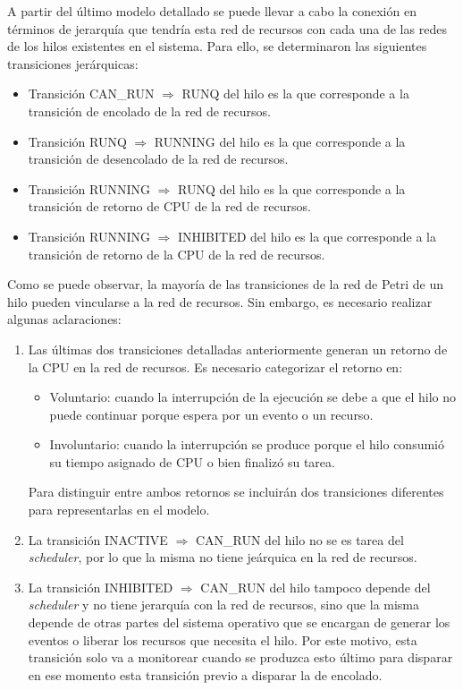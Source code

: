 \documentclass[a4paper]{book}
\begin{document}
A partir del \'ultimo modelo detallado se puede llevar a cabo la conexi\'on en t\'erminos de jerarqu\'ia que tendr\'ia esta red de recursos con cada una de las redes de los hilos existentes en el sistema. Para ello, se determinaron las siguientes transiciones jer\'arquicas:
\begin{itemize}
\item Transici\'on CAN\_RUN $\Rightarrow$ RUNQ del hilo es la que corresponde a la transici\'on de encolado de la red de recursos.
\item Transici\'on RUNQ $\Rightarrow$ RUNNING del hilo es la que corresponde a la transici\'on de desencolado de la red de recursos.
\item Transici\'on RUNNING $\Rightarrow$ RUNQ del hilo es la que corresponde a la transici\'on de retorno de CPU de la red de recursos.
\item Transici\'on RUNNING $\Rightarrow$ INHIBITED del hilo es la que corresponde a la transici\'on de retorno de la CPU de la red de recursos.
\end{itemize}

Como se puede observar, la mayor\'ia de las transiciones de la red de Petri de un hilo pueden vincularse a la red de recursos. Sin embargo, es necesario realizar algunas aclaraciones:
\begin{enumerate}
\item Las \'ultimas dos transiciones detalladas anteriormente generan un retorno de la CPU en la red de recursos. Es necesario categorizar el retorno en:
\begin{itemize}
\item Voluntario: cuando la interrupci\'on de la ejecuci\'on se debe a que el hilo no puede continuar porque espera por un evento o un recurso.
\item Involuntario: cuando la interrupci\'on se produce porque el hilo consumi\'o su tiempo asignado de CPU o bien finaliz\'o su tarea.
\end{itemize}
Para distinguir entre ambos retornos se incluir\'an dos transiciones diferentes para representarlas en el modelo.
\item La transici\'on INACTIVE $\Rightarrow$ CAN\_RUN del hilo no se es tarea del \emph{scheduler}, por lo que la misma no tiene je\'arquica en la red de recursos.
\item La transici\'on INHIBITED $\Rightarrow$ CAN\_RUN del hilo tampoco depende del \emph{scheduler} y no tiene jerarqu\'ia con la red de recursos, sino que la misma depende de otras partes del sistema operativo que se encargan de generar los eventos o liberar los recursos que necesita el hilo. Por este motivo, esta transici\'on solo va a monitorear cuando se produzca esto \'ultimo para disparar en ese momento esta transici\'on previo a disparar la de encolado.
\end{enumerate}
\end{document}
